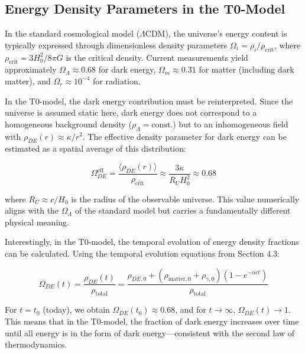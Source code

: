 \documentclass[a4paper,12pt]{article}
\theoremstyle{definition}
\theoremstyle{remark}
\begin{document}
	\subsection{Energy Density Parameters in the T0-Model}
	
	In the standard cosmological model (\(\Lambda\)CDM), the universe's energy content is typically expressed through dimensionless density parameters \(\Omega_i = \rho_i/\rho_{\text{crit}}\), where \(\rho_{\text{crit}} = 3H_0^2/8\pi G\) is the critical density. Current measurements yield approximately \(\Omega_{\Lambda} \approx 0.68\) for dark energy, \(\Omega_m \approx 0.31\) for matter (including dark matter), and \(\Omega_r \approx 10^{-4}\) for radiation.
	
	In the T0-model, the dark energy contribution must be reinterpreted. Since the universe is assumed static here, dark energy does not correspond to a homogeneous background density (\(\rho_{\Lambda} = \text{const.}\)) but to an inhomogeneous field with \(\rho_{DE}(r) \approx \kappa/r^2\). The effective density parameter for dark energy can be estimated as a spatial average of this distribution:
	
	\begin{equation}
		\Omega_{DE}^{\text{eff}} = \frac{\langle\rho_{DE}(r)\rangle}{\rho_{\text{crit}}} \approx \frac{3\kappa}{R_U H_0^2} \approx 0.68
	\end{equation}
	
	where \(R_U \approx c/H_0\) is the radius of the observable universe. This value numerically aligns with the \(\Omega_{\Lambda}\) of the standard model but carries a fundamentally different physical meaning.
	
	Interestingly, in the T0-model, the temporal evolution of energy density fractions can be calculated. Using the temporal evolution equations from Section 4.3:
	
	\begin{equation}
		\Omega_{DE}(t) = \frac{\rho_{DE}(t)}{\rho_{\text{total}}} = \frac{\rho_{DE,0} + (\rho_{\text{matter},0} + \rho_{\gamma,0})(1 - e^{-\alpha c t})}{\rho_{\text{total}}}
	\end{equation}
	
	For \(t = t_0\) (today), we obtain \(\Omega_{DE}(t_0) \approx 0.68\), and for \(t \rightarrow \infty\), \(\Omega_{DE}(t) \rightarrow 1\). This means that in the T0-model, the fraction of dark energy increases over time until all energy is in the form of dark energy—consistent with the second law of thermodynamics.
	
\end{document}
